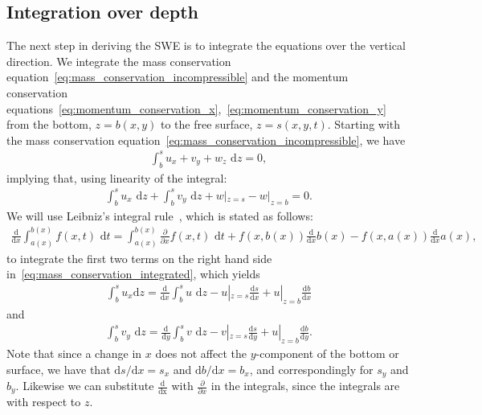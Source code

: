 \subsection{Integration over depth}
The next step in deriving the SWE is to integrate the equations over the vertical direction.
We integrate the mass conservation equation~\eqref{eq:mass_conservation_incompressible} and the momentum conservation equations~\eqref{eq:momentum_conservation_x},~\eqref{eq:momentum_conservation_y} from the bottom, $z = b(x,y)$ to the free surface, $z = s(x,y,t)$.
Starting with the mass conservation equation~\eqref{eq:mass_conservation_incompressible}, we have
\begin{align*}
    \int_{b}^{s} u_x + v_y + w_z \text{ d} z = 0,
\end{align*}
implying that, using linearity of the integral:
\begin{align}\label{eq:mass_conservation_integrated}
    \int_{b}^{s} u_x \text{ d} z + \int_{b}^{s} v_y \text{ d} z  + w|_{z = s} - w|_{z = b} = 0.
\end{align}
We will use Leibniz's integral rule~\cite{Leibniz}, which is stated as follows:
\begin{align}\label{eq:leibniz_rule}
    \frac{\text{d}}{\text{d} x} \int_{a(x)}^{b(x)} f(x,t) \text{ d} t
    = \int_{a(x)}^{b(x)} \frac{\partial }{\partial x} f(x, t) \text{ d} t + f(x, b(x)) \frac{\text{d}}{\text{d} x} b(x) - f(x, a(x)) \frac{\text{d}}{\text{d} x} a(x),
\end{align}
to integrate the first two terms on the right hand side in~\eqref{eq:mass_conservation_integrated}, which yields
\begin{align*}
    \int_{b}^{s} u_x \text{d} z =  \frac{\text{d}}{\text{d} x}  \int_{b}^{s} u \text{ d} z  - u|_{z = s} \frac{\text{d} s}{\text{d} x} + u|_{z = b} \frac{\text{d} b}{\text{d} x}
\end{align*}
and 
\begin{align*}
    \int_{b}^{s} v_y \text{ d} z =  \frac{\text{d}}{\text{d} y}  \int_{b}^{s} v \text{ d} z  - v|_{z = s} \frac{\text{d} s}{\text{d} y} + u|_{z = b} \frac{\text{d} b}{\text{d} y}.
\end{align*}
Note that since a change in $x$ does not affect the $y$-component of the bottom or surface, we have that $\text{d} s/\text{d} x = s_x$ and $\text{d} b / \text{d} x = b_x$, and correspondingly for $s_y$ and $b_y$.
Likewise we can substitute $\frac{\text{d}}{\text{dx}}$ with $\frac{\partial}{\partial x}$ in the integrals, since the integrals are with respect to $z$.
